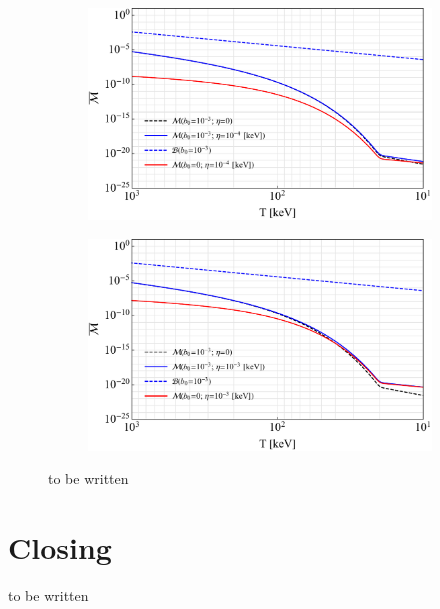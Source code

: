 \documentclass[a4paper]{article}
\begin{document}
\begin{figure}[ht]
    \centering
    \begin{subfigure}[b]{0.49\textwidth}
        \includegraphics[width=\textwidth]{SpinLowFugacity.pdf}
    \end{subfigure}
    \hfill
    \begin{subfigure}[b]{0.49\textwidth}
        \includegraphics[width=\textwidth]{SpinMidFugacity.pdf}
    \end{subfigure}
    \caption{to be written}
    \label{fig:spin}
\end{figure}

\section{Closing}
\label{sec:conclusions}
\noindent to be written



\end{document}
